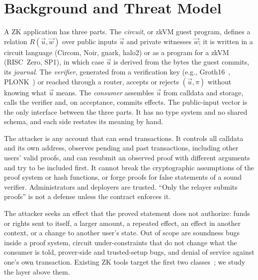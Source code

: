 \section{Background and Threat Model}\label{sec:background}

A ZK application has three parts. The \emph{circuit}, or zkVM guest program,
defines a relation $R(\vec{u},\vec{w})$ over public inputs $\vec{u}$ and
private witnesses $\vec{w}$; it is written in a circuit language (Circom,
Noir, gnark, halo2) or as a program for a zkVM (RISC~Zero, SP1), in which case
$\vec{u}$ is derived from the bytes the guest commits, its \emph{journal}. The
\emph{verifier}, generated from a verification key (e.g.,
Groth16~\cite{groth16}, PLONK~\cite{plonk}) or reached through a router,
accepts or rejects $(\vec{u},\pi)$ without knowing what $\vec{u}$ means. The
\emph{consumer} assembles $\vec{u}$ from calldata and storage, calls the
verifier and, on acceptance, commits effects. The public-input vector is the
only interface between the three parts. It has no type system and no shared
schema, and each side restates its meaning by hand.

The attacker is any account that can send transactions. It controls all
calldata and its own address, observes pending and past transactions,
including other users' valid proofs, and can resubmit an observed proof with
different arguments and try to be included first. It cannot break the
cryptographic assumptions of the proof system or hash functions, or forge
proofs for false statements of a sound verifier. Administrators and deployers
are trusted. ``Only the relayer submits proofs'' is not a defense unless the
contract enforces it.

The attacker seeks an effect that the proved statement does not authorize:
funds or rights sent to itself, a larger amount, a repeated effect, an effect
in another context, or a change to another user's state. Out of scope are
soundness bugs inside a proof system, circuit under-constraints that do not
change what the consumer is told, prover-side and trusted-setup bugs, and
denial of service against one's own transaction. Existing ZK tools target the
first two classes~\cite{sok-snark-bugs,picus,circomspect}; we study the layer
above them.
